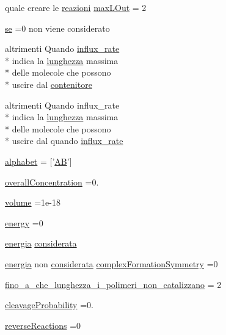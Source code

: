 \begin{DoxyCompactItemize}
quale creare le \hyperlink{a00113_a69962f56e60d0c88abc5d4b6839c2886}{reazioni} \hyperlink{a00113_abb126c97fed10420e64f85923bf5e04b}{max\-L\-Out} = 2
\item 
\hyperlink{a00113_a99032f27eaf45da350b544c68aa6467c}{se} =0 non viene considerato
\item 
altrimenti Quando \hyperlink{a00113_ad795c71664f3161dc8f7a769341daadf}{influx\-\_\-rate} \\*
indica la \hyperlink{a00106_a984d293145d85a936f430c0990316e51}{lunghezza} massima \\*
delle molecole che possono \\*
uscire dal \hyperlink{a00113_a8fcf98921930aa3720acdd081c5b0c2f}{contenitore}
\item 
altrimenti Quando influx\-\_\-rate \\*
indica la \hyperlink{a00106_a984d293145d85a936f430c0990316e51}{lunghezza} massima \\*
delle molecole che possono \\*
uscire dal quando \hyperlink{a00113_ad795c71664f3161dc8f7a769341daadf}{influx\-\_\-rate}
\item 
\hyperlink{a00113_abcbc32fc68e4323620d6171a17310212}{alphabet} = \mbox{[}'\hyperlink{a00111_abfef5bcdab19147dbfbb68112da17044}{A\-B}'\mbox{]}
\item 
\hyperlink{a00113_a59597688ed79473c0234f45eb9167574}{overall\-Concentration} =0.
\item 
\hyperlink{a00113_a9bc498ccac8db41438f855f5dd3f4c05}{volume} =1e-\/18
\item 
\hyperlink{a00113_ac002779c383d2cc783e881f94449de66}{energy} =0
\item 
\hyperlink{a00113_a15a0e3f3007df072a07460518322b944}{energia} \hyperlink{a00113_ad76697f83c5d8bf201c45822af227e21}{considerata}
\item 
\hyperlink{a00113_a15a0e3f3007df072a07460518322b944}{energia} non \hyperlink{a00113_ad76697f83c5d8bf201c45822af227e21}{considerata} \hyperlink{a00113_ac5d9cfec5453da5efc3e8d574b455833}{complex\-Formation\-Symmetry} =0
\item 
\hyperlink{a00113_ab6966d9ee620bc7376dc41a38352b948}{fino\-\_\-a\-\_\-che\-\_\-lunghezza\-\_\-i\-\_\-polimeri\-\_\-non\-\_\-catalizzano} = 2
\item 
\hyperlink{a00113_a9d512df05ee559766d2b8f08e4704b04}{cleavage\-Probability} =0.
\item 
\hyperlink{a00113_a650532b3a3c04865cc35cff6d567c5c0}{reverse\-Reactions} =0
\item 

\end{DoxyCompactItemize}
